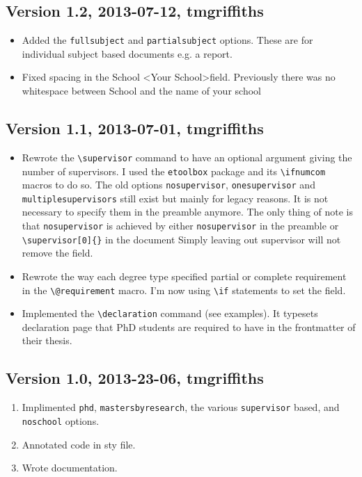 \documentclass[12pt,oneside]{article}
\newcommand{\oporcom}[1]{\texttt{\color{RoyalBlue}#1}} %
\begin{document}
\subsection*{Version 1.2, 2013-07-12, tmgriffiths}
\begin{itemize}
    \item Added the \oporcom{fullsubject} and \oporcom{partialsubject} options. These are for individual subject based documents e.g. a report.
    \item Fixed spacing in the School \textless{}Your School\textgreater field. Previously there was no whitespace between School and the name of your school
\end{itemize}    
\subsection*{Version 1.1, 2013-07-01, tmgriffiths}
\begin{itemize}
    \item Rewrote the \oporcom{\textbackslash{}supervisor} command to have an optional argument giving the number of supervisors. I used the \texttt{etoolbox} package and its \texttt{\textbackslash{}ifnumcom} macros to do so. The old options \oporcom{nosupervisor}, \oporcom{onesupervisor} and \oporcom{multiplesupervisors} still exist but mainly for legacy reasons. It is not necessary to specify them in the preamble anymore. The only thing of note is that \oporcom{nosupervisor} is achieved by either \oporcom{nosupervisor} in the preamble or \oporcom{\textbackslash{}supervisor}\texttt{[0]\{\}} in the document Simply leaving out supervisor will not remove the field.
    \item Rewrote the way each degree type specified partial or complete requirement in the \oporcom{\textbackslash{}@requirement} macro. I'm now using \texttt{\textbackslash{}if} statements to set the field.
    \item Implemented the \oporcom{\textbackslash{}declaration} command (see examples). It typesets declaration page that PhD students are required to have in the frontmatter of their thesis.
\end{itemize}

\subsection*{Version 1.0, 2013-23-06, tmgriffiths}
\begin{enumerate}
    \item Implimented \oporcom{phd}, \oporcom{mastersbyresearch}, the various \oporcom{supervisor} based, and \oporcom{noschool} options.
    \item Annotated code in sty file.
    \item Wrote documentation.
\end{enumerate}
\end{document}
